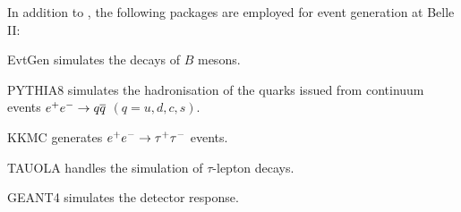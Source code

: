 In addition to \basft, the following packages are employed for event generation at Belle II:
\bi
\item EvtGen \cite{Lange2001} simulates the decays of $B$ mesons.
\item PYTHIA8 \cite{Sjoestrand2015} simulates the hadronisation of the quarks issued from continuum events $e^+e^-\rightarrow q\overline q$ $(q=u,d,c,s)$.
\item KKMC \cite{Jadach:1999vf,Jadach:2000ir} generates $e^+e^-\rightarrow\tau^+\tau^-$ events.
\item TAUOLA \cite{Jadach1991, Davidson:2010rw} handles the simulation of $\tau$-lepton decays.
\item GEANT4 \cite{Agostinelli2003} simulates the detector response.
\ei
